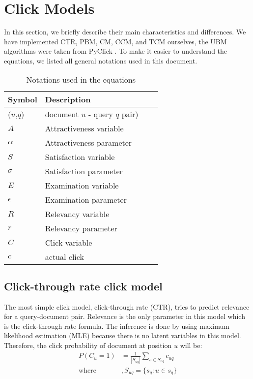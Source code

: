 \section{Click Models}
\label{sec:methodology}
In this section, we briefly describe their main characteristics and differences. We have implemented CTR, PBM, CM, CCM, and TCM ourselves, the UBM algorithms were taken from PyClick \cite{PyClick}. To make it easier to understand the equations, we listed all general notations used in this document.

\begin{table}[ht]
	\centering
	\begin{tabular}{l|lll|}
		\hline
		Symbol & Description \\
		\hline
		(\(u\),\(q\)) 	& document $u$ - query $q$ pair)\\
		$ A $ & Attractiveness variable \\
		$ \alpha $ & Attractiveness parameter \\
		$ S $ & Satisfaction variable \\
		$ \sigma $ & Satisfaction parameter \\
		$ E $ & Examination variable \\
		$ \epsilon $ & Examination parameter \\
		$ R $ & Relevancy variable \\
		$ r $ & Relevancy parameter \\
		$ C $ & Click variable \\
		$ c $ & actual click\\
		\hline
	\end{tabular}
	\caption{Notations used in the equations}
	\label{table:tcm_notations}
\end{table}

\subsection{Click-through rate click model}
The most simple click model, click-through rate (CTR), tries to predict relevance for a query-document pair. Relevance is the only parameter in this model which is the click-through rate formula. The inference is done by using maximum likelihood estimation (MLE) because there is no latent variables in this model. Therefore, the click probability of document at position $u$ will be:
\begin{align}
	P(C_{u}=1) &= \frac{1}{|S_{uq}|} \sum_{s \in S_{uq}} c_{uq}\\
	\text{where}&, S_{uq} = \{ s_q : u \in s_q \} \nonumber
\end{align}


